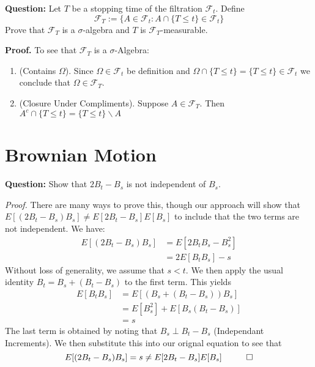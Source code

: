 \documentclass{article}
\begin{document}
\begin{tcolorbox}[colframe=black,colback=gray!5,boxrule=0.5pt]
\textbf{Question:} Let $T$ be a stopping time of the filtration $\mathcal{F}_t$. Define 
$$\mathcal{F}_T := \{A\in\mathcal{F}_t : A\cap\{T\leq t\}\in\mathcal{F}_t\}$$
Prove that $\mathcal{F}_T$ is a $\sigma$-algebra and $T$ is $\mathcal{F}_T$-measurable.
\end{tcolorbox}
\textbf{Proof.} To see that $\mathcal{F}_T$ is a $\sigma$-Algebra: 
\begin{enumerate}
    \item (Contains $\Omega$). Since $\Omega\in\mathcal{F}_t$ be definition and $\Omega \cap\{T\leq t\} = \{T\leq t\}\in\mathcal{F}_t$ we conclude that $\Omega\in\mathcal{F}_T$. 
    \item (Closure Under Compliments). Suppose $A\in\mathcal{F}_T$. Then $A^c\cap\{T\leq t\} = \{T\leq t\}\backslash A $
\end{enumerate}


\newpage
\section{Brownian Motion}

\begin{tcolorbox}[colframe=black,colback=gray!5,boxrule=0.5pt]
\textbf{Question:} Show that $2B_{t} - B_s$ is not independent of $B_s$. \cite{Fima}
\end{tcolorbox}
\textit{Proof.} There are many ways to prove this, though our approach will show that $E[(2B_t-B_s)B_s]\neq E[2B_t-B_s] E[B_s]$ to include that the two terms are not independent. We have: 
\begin{align*}
    E[(2B_t-B_s)B_s] &= E[2B_tB_s - B_s^2] \\
    &= 2E[B_t B_s] - s
\end{align*}
Without loss of generality, we assume that $s<t$. We then apply the usual identity $B_t = B_s + (B_t - B_s)$ to the first term. This yields
\begin{align*}
    E[B_t B_s] &= E[(B_s + (B_t - B_s))B_s] \\
    &=E[B_s^2] + E[B_s(B_t - B_s)] \\
    &= s
\end{align*}
The last term is obtained by noting that $B_s \perp B_{t} - B_s$ (Independant Increments). We then substitute this into our orignal equation to see that 
$$E[(2B_t-B_s)B_s] = s \neq E[2B_t-B_s]E[B_s] \hspace{10mm} \Box$$
\end{document}
